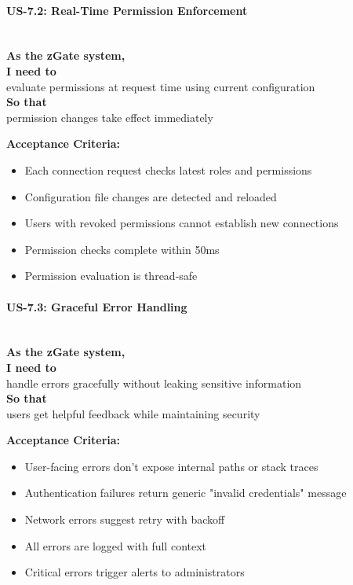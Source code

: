 \paragraph{US-7.2: Real-Time Permission Enforcement}
\mbox{}\\[0.5em]

\noindent\textbf{As the zGate system,} \\
\textbf{I need to} \\
evaluate permissions at request time using current configuration \\
\textbf{So that} \\
permission changes take effect immediately

\noindent\textbf{Acceptance Criteria:}
\begin{itemize}
    \item Each connection request checks latest roles and permissions
    \item Configuration file changes are detected and reloaded
    \item Users with revoked permissions cannot establish new connections
    \item Permission checks complete within 50ms
    \item Permission evaluation is thread-safe
\end{itemize}

\paragraph{US-7.3: Graceful Error Handling}
\mbox{}\\[0.5em]

\noindent\textbf{As the zGate system,} \\
\textbf{I need to} \\
handle errors gracefully without leaking sensitive information \\
\textbf{So that} \\
users get helpful feedback while maintaining security

\noindent\textbf{Acceptance Criteria:}
\begin{itemize}
    \item User-facing errors don't expose internal paths or stack traces
    \item Authentication failures return generic "invalid credentials" message
    \item Network errors suggest retry with backoff
    \item All errors are logged with full context
    \item Critical errors trigger alerts to administrators
\end{itemize}

